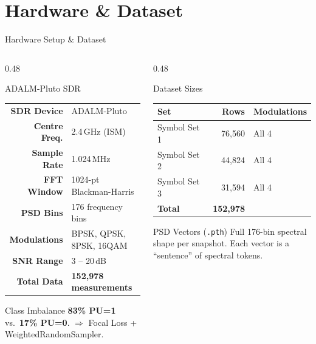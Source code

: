 \documentclass[aspectratio=169, 10pt]{beamer}
\begin{document}
\section{Hardware \& Dataset}
\begin{frame}{Hardware Setup \& Dataset}
\small
\begin{columns}[T]
\begin{column}{0.48\textwidth}
\begin{block}{ADALM-Pluto SDR}
\footnotesize
\renewcommand{\arraystretch}{1.2}
\begin{tabular}{@{}rl@{}}
\textbf{SDR Device}  & ADALM-Pluto \\
\textbf{Centre Freq.} & 2.4\,GHz (ISM) \\
\textbf{Sample Rate} & 1.024\,MHz \\
\textbf{FFT Window}  & 1024-pt Blackman-Harris \\
\textbf{PSD Bins}    & 176 frequency bins \\
\textbf{Modulations} & BPSK, QPSK, 8PSK, 16QAM \\
\textbf{SNR Range}   & 3 -- 20\,dB \\
\textbf{Total Data}  & \textbf{152,978 measurements} \\
\end{tabular}
\end{block}
\begin{alertblock}{Class Imbalance}
\footnotesize \textbf{83\% PU=1} vs.\ \textbf{17\% PU=0}.
$\Rightarrow$ Focal Loss + WeightedRandomSampler.
\end{alertblock}
\end{column}

\begin{column}{0.48\textwidth}
\begin{block}{Dataset Sizes}
\footnotesize
\renewcommand{\arraystretch}{1.2}
\begin{tabular}{@{}lrl@{}}
\toprule
\textbf{Set} & \textbf{Rows} & \textbf{Modulations} \\
\midrule
Symbol Set 1 & 76,560 & All 4 \\
Symbol Set 2 & 44,824 & All 4 \\
Symbol Set 3 & 31,594 & All 4 \\
\midrule
\textbf{Total} & \textbf{152,978} & \\
\bottomrule
\end{tabular}
\end{block}
\begin{exampleblock}{PSD Vectors (\texttt{.pth})}
\footnotesize
Full 176-bin spectral shape per snapshot. Each vector is a ``sentence'' of spectral tokens.
\end{exampleblock}
\end{column}
\end{columns}
\end{frame}
\end{document}
